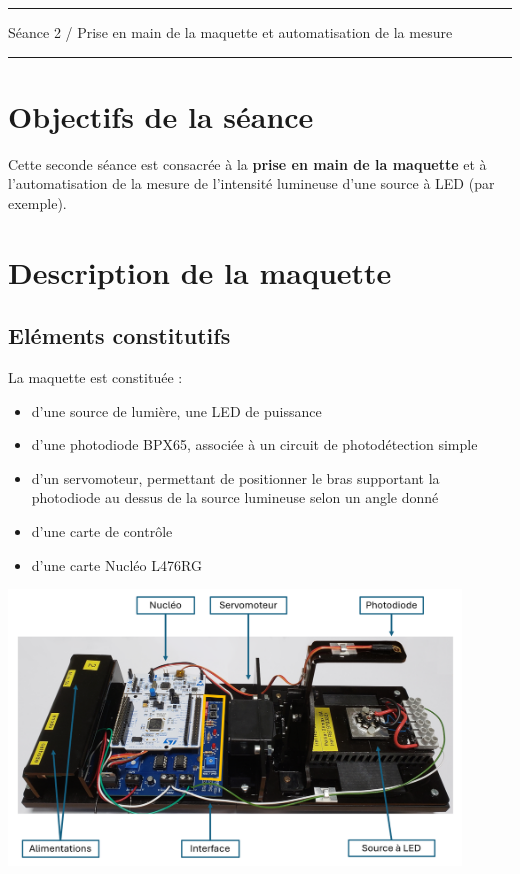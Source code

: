 \documentclass[a4paper,11pt,titlepage]{article} %
\begin{document}
\vspace{0.5cm}

\noindent \rule{\linewidth}{1pt}

{\noindent\Large \rule[-7pt]{0pt}{30pt} Séance 2 / Prise en main de la maquette et automatisation de la mesure} 

\noindent \rule{\linewidth}{1pt}


\section{Objectifs de la séance}

Cette seconde séance est consacrée à la \textbf{prise en main de la maquette} et à l'automatisation de la mesure de l'intensité lumineuse d'une source à LED (par exemple).


\section{Description de la maquette}


\subsection{Eléments constitutifs}

La maquette est constituée :

\begin{itemize}
	\item d'une source de lumière, une LED de puissance
	\item d'une photodiode BPX65, associée à un circuit de photodétection simple
	\item d'un servomoteur, permettant de positionner le bras supportant la photodiode au dessus de la source lumineuse selon un angle donné
	\item d'une carte de contrôle
	\item d'une carte Nucléo L476RG
\end{itemize}

\begin{center}
	\includegraphics[width=0.9\textwidth]{images/maquette_rayon.png}
\end{center}
\end{document}
